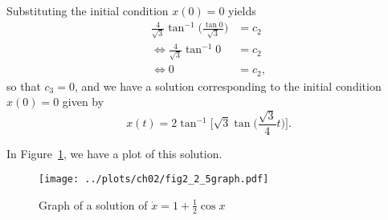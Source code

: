 Substituting the initial condition $x(0) = 0$ yields
\begin{equation*}
    \begin{split}
        \frac{4}{\sqrt{3}}\tan^{-1}{\biggl(\frac{\tan{0}}{\sqrt{3}}\biggr)}
        &= c_2 \\ 
        \Leftrightarrow \frac{4}{\sqrt{3}}\tan^{-1}{0} &= c_2 \\
        \Leftrightarrow 0 &= c_2,
    \end{split}
\end{equation*}
so that $c_3 = 0$, and we have a solution corresponding to the initial condition $x(0) = 0$
given by
\[
    x(t) = 2\tan^{-1}\biggl[\sqrt{3}\tan{\biggl(\frac{\sqrt{3}}{4}t\biggr)} \biggr].
\]

In Figure~\ref{fig2_2_5graph}, we have a plot of this solution.
\begin{figure}[!ht]
    \texttt{[image: ../plots/ch02/fig2\_2\_5graph.pdf]}
    \caption{Graph of a solution of $\dot{x} = 1 + \frac{1}{2}\cos{x}$\label{fig2_2_5graph}}
\end{figure}
